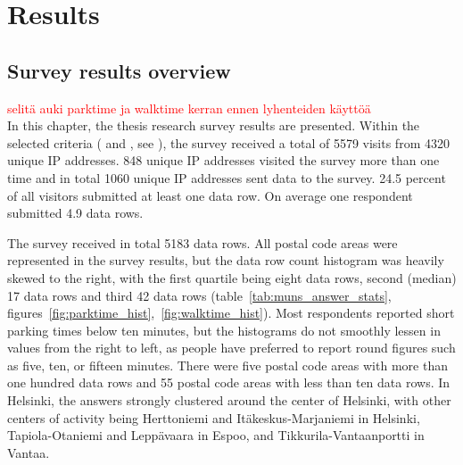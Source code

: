 \section{Results}
\subsection{Survey results overview}
\justify

\textcolor{red}{selitä auki parktime ja walktime kerran ennen lyhenteiden käyttöä}\\
In this chapter, the thesis research survey results are presented. Within the selected criteria ( and , see \hyperref[sec:processdata]{}), the survey received a total of 5579 visits from 4320 unique IP addresses. 848 unique IP addresses visited the survey more than one time and in total 1060 unique IP addresses sent data to the survey. 24.5 percent of all visitors submitted at least one data row. On average one respondent submitted 4.9 data rows.

The survey received in total 5183 data rows. All postal code areas were represented in the survey results, but the data row count histogram was heavily skewed to the right, with the first quartile being eight data rows, second (median) 17 data rows and third 42 data rows (table~\ref{tab:muns_answer_stats}, figures~\ref{fig:parktime_hist},~\ref{fig:walktime_hist}). Most respondents reported short parking times below ten minutes, but the histograms do not smoothly lessen in values from the right to left, as people have preferred to report round figures such as five, ten, or fifteen minutes. There were five postal code areas with more than one hundred data rows and 55 postal code areas with less than ten data rows. In Helsinki, the answers strongly clustered around the center of Helsinki, with other centers of activity being Herttoniemi and Itäkeskus-Marjaniemi in Helsinki, Tapiola-Otaniemi and Leppävaara in Espoo, and Tikkurila-Vantaanportti in Vantaa.

